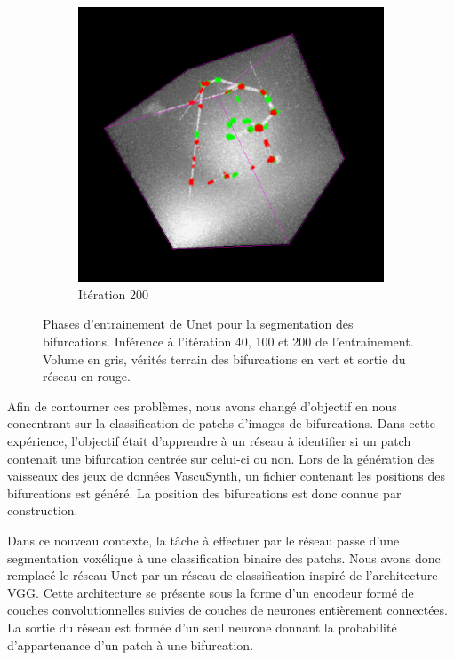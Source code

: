 \begin{figure}[!ht]
\begin{subfigure}{0.45\textwidth}
        \includegraphics[width=\textwidth]{Images/exp_seg_200.png}
        \caption{Itération 200}
    \end{subfigure}
    \caption{Phases d'entrainement de Unet pour la segmentation des bifurcations. Inférence à l'itération 40, 100 et 200 de l'entrainement. Volume en gris, vérités terrain des bifurcations en vert et sortie du réseau en rouge. }
    \label{fig:seg_deep}
\end{figure}

Afin de contourner ces problèmes, nous avons changé d'objectif en nous concentrant sur la classification de patchs d'images de bifurcations. Dans cette expérience, l'objectif était d'apprendre à un réseau à identifier si un patch contenait une bifurcation centrée sur celui-ci ou non. Lors de la génération des vaisseaux des jeux de données VascuSynth, un fichier contenant les positions des bifurcations est généré. La position des bifurcations est donc connue par construction.

Dans ce nouveau contexte, la tâche à effectuer par le réseau passe d'une segmentation voxélique à une classification binaire des patchs. Nous avons donc remplacé le réseau Unet par un réseau de classification inspiré de l'architecture VGG. Cette architecture se présente sous la forme d'un encodeur formé de couches convolutionnelles suivies de couches de neurones entièrement connectées. La sortie du réseau est formée d'un seul neurone donnant la probabilité d'appartenance d'un patch à une bifurcation. 

